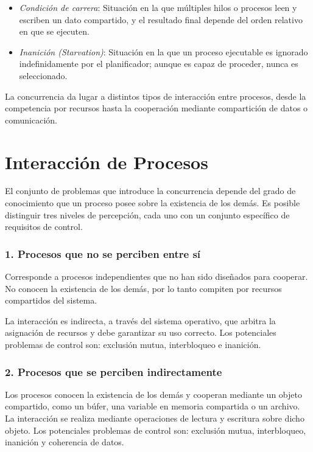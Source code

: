\begin{itemize}
\item \textit{Condición de carrera}: Situación en la que múltiples hilos o procesos leen y escriben un dato compartido, y el resultado final depende del orden relativo en que se ejecuten.

\item \textit{Inanición (Starvation)}: Situación en la que un proceso ejecutable es ignorado indefinidamente por el planificador; aunque es capaz de proceder, nunca es seleccionado.
\end{itemize}

La concurrencia da lugar a distintos tipos de interacción entre procesos, desde la competencia por recursos hasta la cooperación mediante compartición de datos o comunicación.

\section{Interacción de Procesos}

El conjunto de problemas que introduce la concurrencia depende del grado de conocimiento que un proceso posee sobre la existencia de los demás. Es posible distinguir tres niveles de percepción, cada uno con un conjunto específico de requisitos de control.

\subsubsection{1. Procesos que no se perciben entre sí}

Corresponde a procesos independientes que no han sido diseñados para cooperar. No conocen la existencia de los demás, por lo tanto compiten por recursos compartidos del sistema.

La interacción es indirecta, a través del sistema operativo, que arbitra la asignación de recursos y debe garantizar su uso correcto. Los potenciales problemas de control son: exclusión mutua, interbloqueo e inanición.

\subsubsection{2. Procesos que se perciben indirectamente}

Los procesos conocen la existencia de los demás y cooperan mediante un objeto compartido, como un búfer, una variable en memoria compartida o un archivo. La interacción se realiza mediante operaciones de lectura y escritura sobre dicho objeto. Los potenciales problemas de control son: exclusión mutua, interbloqueo, inanición y coherencia de datos.

